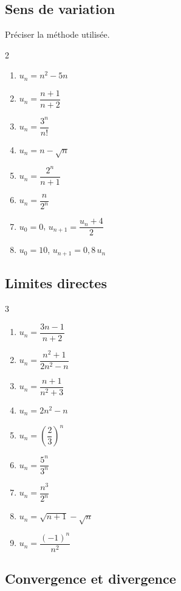 \subsection{Sens de variation}

Préciser la méthode utilisée.
\begin{multicols}{2}
\begin{enumerate}
	\item $u_n=n^{2}-5n$
	\item $u_n=\dfrac{n+1}{n+2}$
	\item $u_n=\dfrac{3^{n}}{n!}$
	\item $u_n=n-\sqrt{n}$
	\item $u_n=\dfrac{2^{n}}{n+1}$
	\item $u_n=\dfrac{n}{2^{n}}$
	\item $u_0=0$, $u_{n+1}=\dfrac{u_n+4}{2}$
	\item $u_0=10$, $u_{n+1}=0{,}8\,u_n$
\end{enumerate}
\end{multicols}

\subsection{Limites directes}

\begin{multicols}{3}
\begin{enumerate}
	\item $u_n=\dfrac{3n-1}{n+2}$
	\item $u_n=\dfrac{n^{2}+1}{2n^{2}-n}$
	\item $u_n=\dfrac{n+1}{n^{2}+3}$
	\item $u_n=2n^{2}-n$
	\item $u_n=\left(\dfrac23\right)^{n}$
	\item $u_n=\dfrac{5^{n}}{3^{n}}$
	\item $u_n=\dfrac{n^{3}}{2^{n}}$
	\item $u_n=\sqrt{n+1}-\sqrt{n}$
	\item $u_n=\dfrac{(-1)^{n}}{n^{2}}$
\end{enumerate}
\end{multicols}

\subsection{Convergence et divergence}

